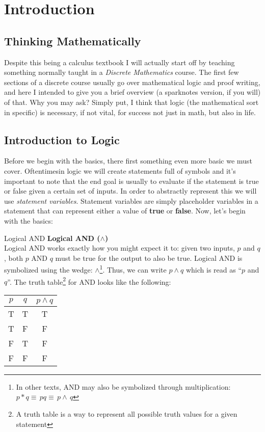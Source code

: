 \section{Introduction}
\subsection{Thinking Mathematically}

Despite this being a calculus textbook I will actually start off by teaching something normally taught in a \textit{Discrete Mathematics} course. The first few sections of a discrete course usually go over mathematical logic and proof writing, and here I intended to give you a brief overview (a sparknotes version, if you will) of that. Why you may ask? Simply put, I think that logic (the mathematical sort in specific) is necessary, if not vital, for success not just in math, but also in life.

\subsection{Introduction to Logic}
Before we begin with the basics, there first something even more basic we must cover. Oftentimesin logic we will create statements full of symbols and it's important to note that the end goal is usually to evaluate if the statement is true or false given a certain set of inputs. In order to abstractly represent this we will use \textit{statement variables}. Statement variables are simply placeholder variables in a statement that can represent either a value of \textbf{true} or \textbf{false}. Now, let's begin with the basics:
\begin{definition}{Logical AND}{}
  \large\textbf{Logical AND ($\land$)} \\
  \normalsize Logical AND works exactly how you might expect it to: given two inputs, $p$ and $q$, both $p$ AND $q$ must be true for the output to also be true. Logical AND is symbolized using the wedge: $\land$\footnote{In other texts, AND may also be symbolized through multiplication: $p*q\equiv\,pq\equiv\,p\land\,q$}. Thus, we can write $p \land q$ which is read as ``$p$ and $q$''. The truth table\footnote{A truth table is a way to represent all possible truth values for a given statement} for AND looks like the following:
  \vspace{0.01in}
  \begin{center}
    \begin{tabular}{ |c|c|c| } 
      \hline
      $p$ & $q$ & $p \land q$ \\ 
      \hline
      T & T & T \\ 
      T & F & F \\ 
      F & T & F \\ 
      F & F & F \\ 
      \hline
    \end{tabular}
  \end{center}
  \vspace{0.01in}
\end{definition}

